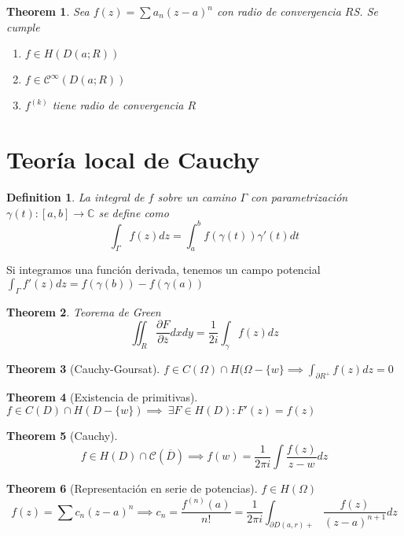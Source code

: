 \documentclass{myclass} \usepackage{verbatim}
\newtheorem*{definition}{Definition}
\newtheorem*{theorem}{Theorem}
\begin{document}
\begin{theorem}
Sea $f(z) = \sum a_n(z-a)^n$ con radio de convergencia $R$S. Se cumple
 \begin{enumerate}[topsep=-6pt, itemsep=0pt]
  \item $f\in H(D(a;R))$
  \item $f\in \mathcal{C}^\infty(D(a;R))$ 
  \item $f^{(k)}$ tiene radio de convergencia $R$
\end{enumerate}
\end{theorem}

\section{Teoría local de Cauchy}
\begin{definition}
La integral de $f$ sobre un camino $\Gamma$ con parametrización $\gamma(t):[a, b]\to \mathbb{C}$ se define como
\[
\int_\Gamma f(z)dz = \int_a^b f(\gamma(t))\gamma'(t)dt
\] 
\end{definition}

Si integramos una función derivada, tenemos un campo potencial $\int_\Gamma f'(z)dz = f(\gamma(b))-f(\gamma(a)) $

\begin{theorem}
Teorema de Green
\[
  \iint_R \frac{\partial F}{\partial \overline{z}}dxdy = \frac{1}{2i}\int_\gamma f(z)dz
\] 
\end{theorem}

\begin{theorem}[Cauchy-Goursat]
$f\in C(\Omega )\cap H(\Omega -\{w\} \implies \displaystyle \int_{\partial R^+} f(z)dz=0$
\end{theorem}

\begin{theorem}[Existencia de primitivas]
$f\in C(D)\cap H(D-\{w\}) \implies \ \exists F\in H(D): F'(z) = f(z)$
\end{theorem}

\begin{theorem}[Cauchy]
\[
f\in H(D)\cap \mathcal{C}(\overline{D}) \implies f(w) = \frac{1}{2\pi i}\int \frac{f(z)}{z-w}dz
\] 
\end{theorem}

\begin{theorem}[Representación en serie de potencias] $f\in H(\Omega )$
\[
f(z) = \sum c_n(z-a)^n \implies c_n = \frac{f^{(n)}(a)}{n!} = \frac{1}{2\pi i} \int_{\partial D(a, r)+} \frac{f(z)}{(z-a)^{n+1}}dz
\] 
\end{theorem}
\end{document}

